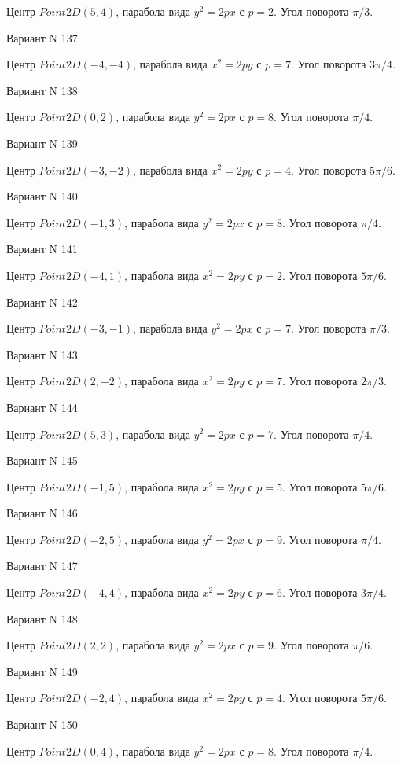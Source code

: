 \documentclass[11pt]{report}
\begin{document}
Центр $Point2D\left(5, 4\right)$, парабола вида $y^{2} = 2px$ с $p = 2$. Угол поворота $\pi / 3$.

Вариант N 137

Центр $Point2D\left(-4, -4\right)$, парабола вида $x^{2} = 2py$ с $p = 7$. Угол поворота $3 \pi / 4$.

Вариант N 138

Центр $Point2D\left(0, 2\right)$, парабола вида $y^{2} = 2px$ с $p = 8$. Угол поворота $\pi / 4$.

Вариант N 139

Центр $Point2D\left(-3, -2\right)$, парабола вида $x^{2} = 2py$ с $p = 4$. Угол поворота $5 \pi / 6$.

Вариант N 140

Центр $Point2D\left(-1, 3\right)$, парабола вида $y^{2} = 2px$ с $p = 8$. Угол поворота $\pi / 4$.

Вариант N 141

Центр $Point2D\left(-4, 1\right)$, парабола вида $x^{2} = 2py$ с $p = 2$. Угол поворота $5 \pi / 6$.

Вариант N 142

Центр $Point2D\left(-3, -1\right)$, парабола вида $y^{2} = 2px$ с $p = 7$. Угол поворота $\pi / 3$.

Вариант N 143

Центр $Point2D\left(2, -2\right)$, парабола вида $x^{2} = 2py$ с $p = 7$. Угол поворота $2 \pi / 3$.

Вариант N 144

Центр $Point2D\left(5, 3\right)$, парабола вида $y^{2} = 2px$ с $p = 7$. Угол поворота $\pi / 4$.

Вариант N 145

Центр $Point2D\left(-1, 5\right)$, парабола вида $x^{2} = 2py$ с $p = 5$. Угол поворота $5 \pi / 6$.

Вариант N 146

Центр $Point2D\left(-2, 5\right)$, парабола вида $y^{2} = 2px$ с $p = 9$. Угол поворота $\pi / 4$.

Вариант N 147

Центр $Point2D\left(-4, 4\right)$, парабола вида $x^{2} = 2py$ с $p = 6$. Угол поворота $3 \pi / 4$.

Вариант N 148

Центр $Point2D\left(2, 2\right)$, парабола вида $y^{2} = 2px$ с $p = 9$. Угол поворота $\pi / 6$.

Вариант N 149

Центр $Point2D\left(-2, 4\right)$, парабола вида $x^{2} = 2py$ с $p = 4$. Угол поворота $5 \pi / 6$.

Вариант N 150

Центр $Point2D\left(0, 4\right)$, парабола вида $y^{2} = 2px$ с $p = 8$. Угол поворота $\pi / 4$.
\end{document}
